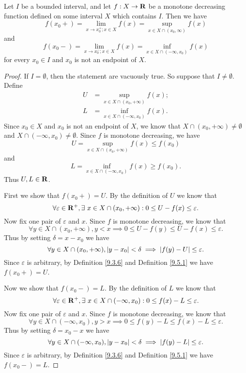 \begin{additional corollary}\label{ac 11.8.2}
Let \(I\) be a bounded interval, and let \(f : X \to \mathbf{R}\) be a monotone decreasing function defined on some interval \(X\) which contains \(I\).
Then we have
\[
    f(x_0+) = \lim_{x \to x_0^+ ; x \in X} f(x) = \sup_{x \in X \cap (x_0, \infty)} f(x)
\]
and
\[
    f(x_0-) = \lim_{x \to x_0^- ; x \in X} f(x) = \inf_{x \in X \cap (-\infty, x_0)} f(x)
\]
for every \(x_0 \in I\) and \(x_0\) is not an endpoint of \(X\).
\end{additional corollary}

\begin{proof}
    If \(I = \emptyset\), then the statement are vacuously true.
    So suppose that \(I \neq \emptyset\).
    Define
    \begin{align*}
        U & = \sup_{x \in X \cap (x_0, +\infty)} f(x); \\
        L & = \inf_{x \in X \cap (-\infty, x_0)} f(x).
    \end{align*}
    Since \(x_0 \in X\) and \(x_0\) is not an endpoint of \(X\), we know that \(X \cap (x_0, +\infty) \neq \emptyset\) and \(X \cap (-\infty, x_0) \neq \emptyset\).
    Since \(f\) is monotone decreasing, we have
    \[
        U = \sup_{x \in X \cap (x_0, +\infty)} f(x) \leq f(x_0)
    \]
    and
    \[
        L = \inf_{x \in X \cap (-\infty, x_0)} f(x) \geq f(x_0).
    \]
    Thus \(U, L \in \mathbf{R}\).

    First we show that \(f(x_0+) = U\).
    By the definition of \(U\) we know that
    \[
        \forall \varepsilon \in \mathbf{R}^+, \exists\ x \in X \cap (x_0, +\infty) : 0 \leq U - f(x) \leq \varepsilon.
    \]
    Now fix one pair of \(\varepsilon\) and \(x\).
    Since \(f\) is monotone decreasing, we know that
    \[
        \forall y \in X \cap (x_0, +\infty), y < x \implies 0 \leq U - f(y) \leq U - f(x) \leq \varepsilon.
    \]
    Thus by setting \(\delta = x - x_0\) we have
    \[
        \forall y \in X \cap (x_0, +\infty), \left\lvert y - x_0\right\rvert < \delta \implies \left\lvert f(y) - U\right\rvert \leq \varepsilon.
    \]
    Since \(\varepsilon\) is arbitrary, by Definition \ref{9.3.6} and Definition \ref{9.5.1} we have \(f(x_0+) = U\).

    Now we show that \(f(x_0-) = L\).
    By the definition of \(L\) we know that
    \[
        \forall \varepsilon \in \mathbf{R}^+, \exists\ x \in X \cap (-\infty, x_0) : 0 \leq f(x) - L \leq \varepsilon.
    \]
    Now fix one pair of \(\varepsilon\) and \(x\).
    Since \(f\) is monotone decreasing, we know that
    \[
        \forall y \in X \cap (-\infty, x_0), y > x \implies 0 \leq f(y) - L \leq f(x) - L \leq \varepsilon.
    \]
    Thus by setting \(\delta = x_0 - x\) we have
    \[
        \forall y \in X \cap (-\infty, x_0), \left\lvert y - x_0\right\rvert < \delta \implies \left\lvert f(y) - L\right\rvert \leq \varepsilon.
    \]
    Since \(\varepsilon\) is arbitrary, by Definition \ref{9.3.6} and Definition \ref{9.5.1} we have \(f(x_0-) = L\).
\end{proof}

